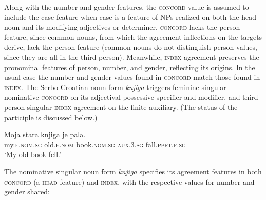 \documentclass[output=paper
                ,modfonts
                ,nonflat
	        ,collection
	        ,collectionchapter
	        ,collectiontoclongg
 	        ,biblatex
                ,babelshorthands
                ,newtxmath
                ,draftmode
                ,colorlinks, citecolor=brown
]{./langsci/langscibook}
\begin{document}
{Along with the number and gender features, the \textsc{concord} value is assumed to include the case feature when case is a feature of NPs  realized on both the head noun and its modifying adjectives or determiner.   \textsc{concord} lacks the person feature, since  common nouns, from which the agreement inflections on the targets derive, lack the person feature (common nouns do not distinguish person values, since they are all in the third person).    Meanwhile, \textsc{index} agreement preserves the pronominal features of person, number, and gender, reflecting its origins.  In the usual case the number and gender values found in \textsc{concord} match those found in \textsc{index}.  The Serbo-Croatian noun form \textit{knjiga} triggers feminine singular nominative \textsc{concord} on its adjectival possessive specifier and modifier, and third person singular \textsc{index} agreement on the finite auxiliary.  (The status of the participle is discussed below.)  

\begin{exe}
\ex  \label{fell}
\gll 	Moja 	stara	 knjiga	je pala.  \\
my.\textsc{f.nom.sg}  old.\textsc{f.nom} 	book.\textsc{nom.sg} 	\textsc{aux.3.sg}  fall.\textsc{pprt.f.sg} \\
\glt`My old book fell.' \citep[18]{Wechsler+Zlatic:2003}
\end{exe}

\noindent
The nominative singular noun form \emph{knjiga} specifies its agreement features in both \textsc{concord} (a \textsc{head} feature) and \textsc{index}, with the respective values for number and gender shared:

}
\end{document}
